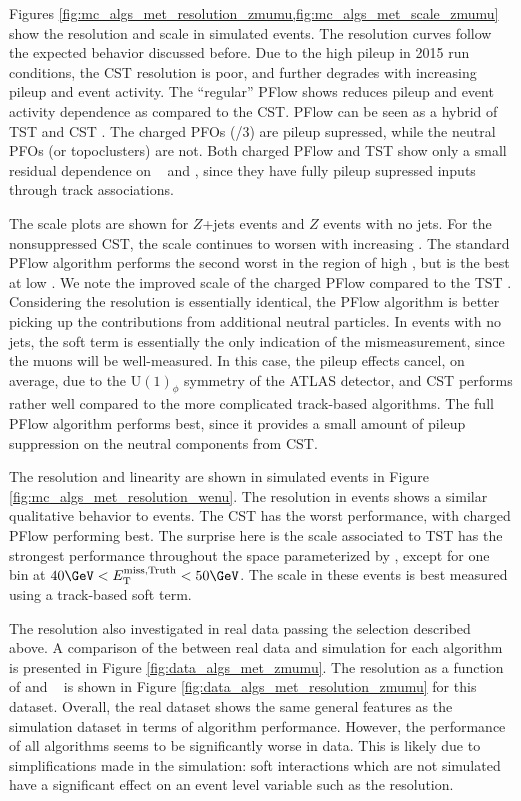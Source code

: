 Figures \cref{fig:mc_algs_met_resolution_zmumu,fig:mc_algs_met_scale_zmumu} show the resolution and scale in simulated \Zmm events.
The resolution curves follow the expected behavior discussed before.
Due to the high pileup in 2015 run conditions, the CST \met resolution is poor, and further degrades with increasing pileup and event activity.
The ``regular'' PFlow \met shows reduces pileup and event activity dependence as compared to the CST.
PFlow \met can be seen as a hybrid of TST \met and CST \met.
The charged PFOs (/3) are pileup supressed, while the neutral PFOs (or topoclusters) are not.
Both charged PFlow and TST \met show only a small residual dependence on \npv~ and \sumET, since they have fully pileup supressed inputs through track associations.

The scale plots are shown for $Z$+jets events and $Z$ events with no jets.
For the nonsuppressed CST, the scale continues to worsen with increasing \ptZ.
The standard PFlow algorithm performs the second worst in the region of high \ptZ, but is the best at low \ptZ.
We note the improved scale of the charged PFlow \met compared to the TST \met.
Considering the resolution is essentially identical, the PFlow algorithm is better picking up the contributions from additional neutral particles.
In events with no jets, the soft term is essentially the only indication of the \met mismeasurement, since the muons will be well-measured.
In this case, the pileup effects cancel, on average, due to the U$(1)_\phi$ symmetry of the ATLAS detector, and CST performs rather well compared to the more complicated track-based algorithms.
The full PFlow algorithm performs best, since it provides a small amount of pileup suppression on the neutral components from CST.

The resolution and linearity are shown in simulated \Wen events in Figure \ref{fig:mc_algs_met_resolution_wenu}.
The resolution in \Wen events shows a similar qualitative behavior to \Zmm events.
The CST \met has the worst performance, with charged PFlow \met performing best.
The surprise here is the scale associated to TST \met has the strongest performance throughout the space parameterized by \mettrue, except for one bin at $40 \GeV < \mettrue < 50 \GeV$.
The scale in these events is best measured using a track-based soft term.

The resolution also investigated in real data passing the \Zmm selection described above.
A comparison of the \met between real data and simulation for each algorithm is presented in Figure \ref{fig:data_algs_met_zmumu}.
The resolution as a function of \sumET and \npv~ is shown in Figure \ref{fig:data_algs_met_resolution_zmumu} for this dataset.
Overall, the real dataset shows the same general features as the simulation dataset in terms of algorithm performance.
However, the performance of all algorithms seems to be significantly worse in data.
This is likely due to simplifications made in the simulation: soft interactions which are not simulated have a significant effect on an event level variable such as the \met resolution.

